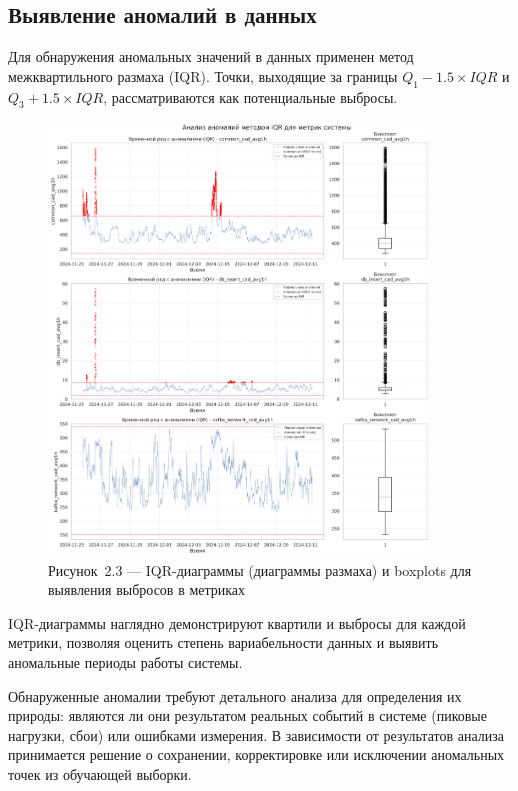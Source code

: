 \subsection{Выявление аномалий в данных}

\hspace*{1.25cm}Для обнаружения аномальных значений в данных применен метод межквартильного размаха (IQR). Точки, выходящие за границы $Q_1 - 1.5 \times IQR$ и $Q_3 + 1.5 \times IQR$, рассматриваются как потенциальные выбросы.

\begin{figure}[H]
	\centering
	\includegraphics[width=0.9\textwidth]{figures/chapter2/outliers_boxplot.png}
	\caption*{Рисунок~2.3 --- IQR-диаграммы (диаграммы размаха) и boxplots для выявления выбросов в метриках}
	\label{fig:outliers_analysis}
\end{figure}

\hspace*{1.25cm}IQR-диаграммы наглядно демонстрируют квартили и выбросы для каждой метрики, позволяя оценить степень вариабельности данных и выявить аномальные периоды работы системы.

\hspace*{1.25cm}Обнаруженные аномалии требуют детального анализа для определения их природы: являются ли они результатом реальных событий в системе (пиковые нагрузки, сбои) или ошибками измерения. В зависимости от результатов анализа принимается решение о сохранении, корректировке или исключении аномальных точек из обучающей выборки. 